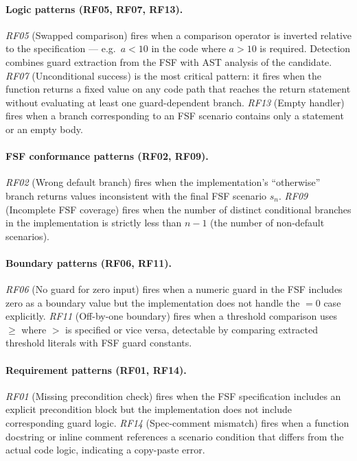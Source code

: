 \paragraph{Logic patterns (RF05, RF07, RF13).}
\emph{RF05} (Swapped comparison) fires when a comparison operator is inverted
relative to the specification — e.g.\ $a < 10$ in the code where $a > 10$
is required.  Detection combines guard extraction from the FSF with AST
analysis of the candidate.
\emph{RF07} (Unconditional success) is the most critical pattern: it fires
when the function returns a fixed value on any code path that reaches the
return statement without evaluating at least one guard-dependent branch.
\emph{RF13} (Empty handler) fires when a branch corresponding to an FSF
scenario contains only a  statement or an empty body.

\paragraph{FSF conformance patterns (RF02, RF09).}
\emph{RF02} (Wrong default branch) fires when the implementation's
``otherwise'' branch returns values inconsistent with the final FSF scenario
$s_n$.  \emph{RF09} (Incomplete FSF coverage) fires when the number of
distinct conditional branches in the implementation is strictly less than $n-1$
(the number of non-default scenarios).

\paragraph{Boundary patterns (RF06, RF11).}
\emph{RF06} (No guard for zero input) fires when a numeric guard in the FSF
includes zero as a boundary value but the implementation does not handle the
$= 0$ case explicitly.  \emph{RF11} (Off-by-one boundary) fires when
a threshold comparison uses $\ge$ where $>$ is specified or vice versa,
detectable by comparing extracted threshold literals with FSF guard constants.

\paragraph{Requirement patterns (RF01, RF14).}
\emph{RF01} (Missing precondition check) fires when the FSF specification
includes an explicit precondition block but the implementation does not include
corresponding guard logic.  \emph{RF14} (Spec-comment mismatch) fires when
a function docstring or inline comment references a scenario condition that
differs from the actual code logic, indicating a copy-paste error.

